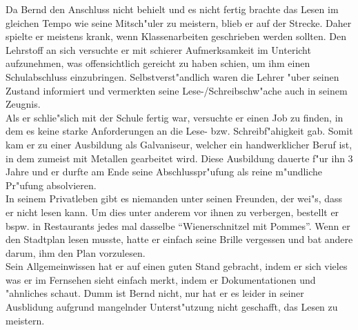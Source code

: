 Da Bernd den Anschluss nicht behielt und es nicht fertig brachte das Lesen im gleichen Tempo wie seine Mitsch"uler zu meistern, blieb er auf der Strecke. Daher spielte er meistens krank, wenn Klassenarbeiten geschrieben werden sollten. Den Lehrstoff an sich versuchte er mit schierer Aufmerksamkeit im Untericht aufzunehmen, was offensichtlich gereicht zu haben schien, um ihm einen Schulabschluss einzubringen. Selbstverst"andlich waren die Lehrer "uber seinen Zustand informiert und vermerkten seine Lese-/Schreibschw"ache auch in seinem Zeugnis.\\

 Als er schlie"slich mit der Schule fertig war, versuchte er einen Job zu finden, in dem es keine starke Anforderungen an die Lese- bzw. Schreibf"ahigkeit gab. Somit kam er zu einer Ausbildung als Galvaniseur, welcher ein handwerklicher Beruf ist, in dem zumeist mit Metallen gearbeitet wird. Diese Ausbildung dauerte f"ur ihn 3 Jahre und er durfte am Ende seine Abschlusspr"ufung als reine m"undliche Pr"ufung absolvieren.\\

In seinem Privatleben gibt es niemanden unter seinen Freunden, der wei"s, dass er nicht lesen kann. Um dies unter anderem vor ihnen zu verbergen, bestellt er bspw. in Restaurants jedes mal dasselbe "`Wienerschnitzel mit Pommes"'. Wenn er den Stadtplan lesen musste, hatte er einfach seine Brille vergessen und bat andere darum, ihm den Plan vorzulesen.\\

Sein Allgemeinwissen hat er auf einen guten Stand gebracht, indem er sich vieles was er im Fernsehen sieht einfach merkt, indem er Dokumentationen und "ahnliches schaut. Dumm ist Bernd nicht, nur hat er es leider in seiner Ausblidung aufgrund mangelnder Unterst"utzung nicht geschafft, das Lesen zu meistern.

